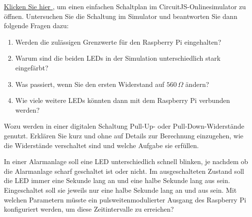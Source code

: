 
\teilaufgabe
\textcolor{red}{
    \href{%
        https://www.falstad.com/circuit/circuitjs.html?ctz=CQAgjCAMB0l3BWcMBMcUHYMGZIA4UA2ATmIxAUgoqoQFMBaMMAKAHMRCUAWCsFTjwoo8UKCwBOnDAO7dRGQqLmiqYSizBcQi5fJB5ss-QIAmdAGYBDAK4AbAC4M7dU+DFUYkVgBlpx0S5eFTEIazsAZzoQbGhscT9CGRi8XiCU3jUQcKiYuPEpJIFsVJ0lDLE8MGJoUjr6+pZsDCpDYtLifgqITyaWgyMQEM6A916AdxARiumQyBZJ2f1phC75rQFdCraKs0tbR2dXMY9YVkWu1YF0q4T-GLRBXiNPdxzo2Pj5wuSXstE-moNJMtn8doC+q1Bn9pn8euILsVHrDSvMAEacBCEECYJDcDDEChY8QADyGigoeFoq0p8V4XQASlYIgAHNF0CQSACeAB0IgAFACWLDJlABQgQxGemCG4AEAHF+QBJADyDAAgjYImwrAA7NgimiiVZpSACVbkekCACyzKifIAFPKJAB7Gy60wASkNlHIJWxkviJUJVpAitVGq1Ov1PsglppgaGCGCcrDyrVmu1eoNGJ2mAExBKRPI8zJqVoeCQnQrylT8roAFs6BEorq6IbDITCJBsZ0u5AQ6mAMoOV0NiIOAAnEgA1nRdSwgA
    }{
        Klicken Sie hier%
    }%
}, um einen einfachen Schaltplan im CircuitJS-Onlinesimulator zu öffnen.
Untersuchen Sie die Schaltung im Simulator und beantworten Sie dann folgende Fragen
dazu:

\begin{enumerate}
    \item Werden die zulässigen Grenzwerte für den Raspberry Pi eingehalten?
    \item Warum sind die beiden LEDs in der Simulation unterschiedlich stark eingefärbt?
    \item Was passiert, wenn Sie den ersten Widerstand auf $560\,\Omega$ ändern?
    \item Wie viele weitere LEDs könnten dann mit dem Raspberry Pi verbunden werden?
\end{enumerate}

\bigskip
\teilaufgabe
Wozu werden in einer digitalen Schaltung Pull-Up- oder Pull-Down-Widerstände
genutzt. Erklären Sie kurz und ohne auf Details zur Berechnung einzugehen, wie
die Widerstände verschaltet sind und welche Aufgabe sie erfüllen.

\bigskip
\teilaufgabe
In einer Alarmanlage soll eine LED unterschiedlich schnell blinken, je nachdem
ob die Alarmanlage scharf geschaltet ist oder nicht. Im ausgeschalteten Zustand
soll die LED immer eine Sekunde lang an und eine halbe Sekunde lang aus sein.
Eingeschaltet soll sie jeweils nur eine halbe Sekunde lang an und aus sein.
Mit welchen Parametern müsste ein pulsweitenmodulierter Ausgang des Raspberry
Pi konfiguriert werden, um diese Zeitintervalle zu erreichen?

